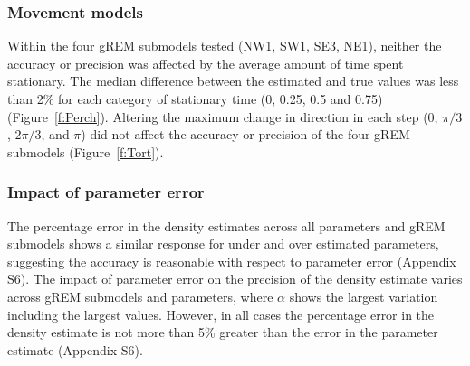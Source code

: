 \subsubsection{Movement models}

Within the four gREM submodels tested (NW1, SW1, SE3, NE1), neither the accuracy or precision was affected by the average amount of time spent stationary.
The median difference between the estimated and true values was less than 2\% for each category of stationary time (0, 0.25, 0.5 and 0.75) (Figure~\ref{f:Perch}).
Altering the maximum change in direction in each step (0, $\pi/3$, $2\pi/3$, and $\pi$) did not affect the accuracy or precision of the four gREM submodels (Figure~\ref{f:Tort}). 

\subsubsection{Impact of parameter error}

The percentage error in the density estimates across all parameters and gREM submodels shows a similar response for under and over estimated parameters, suggesting the accuracy is reasonable with respect to parameter error (Appendix S6).
The impact of parameter error on the precision of the density estimate varies across gREM submodels and parameters, where $\alpha$ shows the largest variation including the largest values.
However, in all cases the percentage error in the density estimate is not more than 5\% greater than the error in the parameter estimate (Appendix S6).



